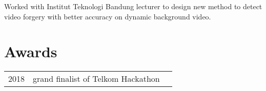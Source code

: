 \documentclass[a4paper]{deedy-resume} %
\begin{document}
\begin{minipage}[t]{0.66\textwidth}
Worked with Institut Teknologi Bandung lecturer to design new method to detect video forgery with better accuracy on dynamic background video.

\sectionspace %


\section{Awards} 

\begin{tabular}{rll}
2018	 & grand finalist of Telkom Hackathon\\
\end{tabular}


\end{minipage} %








\end{document}
